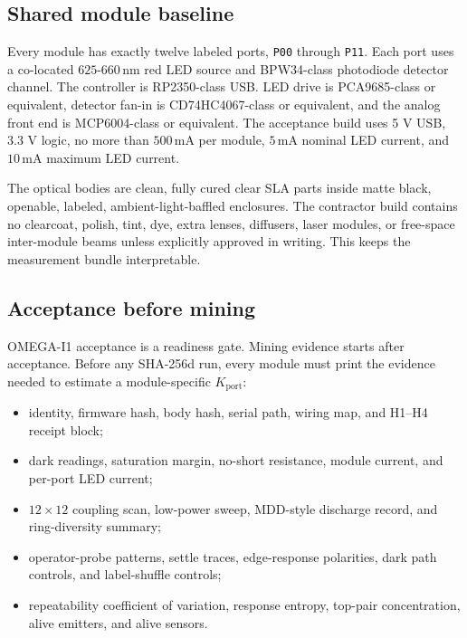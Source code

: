 \documentclass[11pt]{article}
\theoremstyle{definition}
\theoremstyle{remark}
\begin{document}
\subsection{Shared module baseline}

Every module has exactly twelve labeled ports, \texttt{P00} through
\texttt{P11}. Each port uses a co-located \(625\)-\(660\,\mathrm{nm}\) red LED
source and BPW34-class photodiode detector channel. The controller is
RP2350-class USB. LED drive is PCA9685-class or equivalent, detector fan-in is
CD74HC4067-class or equivalent, and the analog front end is MCP6004-class or
equivalent. The acceptance build uses 5 V USB,
3.3 V logic, no more than \(500\,\mathrm{mA}\) per module, \(5\,\mathrm{mA}\)
nominal LED current, and \(10\,\mathrm{mA}\) maximum LED current.

The optical bodies are clean, fully cured clear SLA parts inside matte black,
openable, labeled, ambient-light-baffled enclosures. The contractor build
contains no clearcoat, polish, tint, dye, extra lenses, diffusers, laser modules,
or free-space inter-module beams unless explicitly approved in writing. This
keeps the measurement bundle interpretable.

\subsection{Acceptance before mining}

OMEGA-I1 acceptance is a readiness gate. Mining evidence starts after
acceptance. Before any SHA-256d run, every module must print the evidence needed to estimate a
module-specific \(K_{\mathrm{port}}\):

\begin{itemize}
\item identity, firmware hash, body hash, serial path, wiring map, and H1--H4
receipt block;
\item dark readings, saturation margin, no-short resistance, module current,
and per-port LED current;
\item \(12\times12\) coupling scan, low-power sweep, MDD-style discharge
record, and ring-diversity summary;
\item operator-probe patterns, settle traces, edge-response polarities, dark
path controls, and label-shuffle controls;
\item repeatability coefficient of variation, response entropy, top-pair
concentration, alive emitters, and alive sensors.
\end{itemize}
\end{document}
